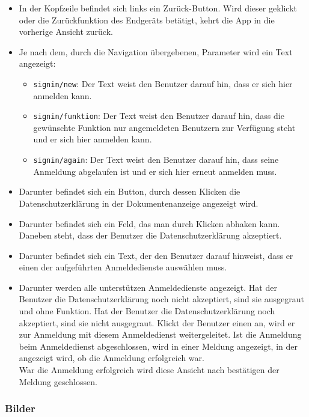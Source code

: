 \begin{itemize}
    \item In der Kopfzeile befindet sich links ein Zurück-Button. Wird dieser geklickt oder die Zurückfunktion 
    des Endgeräts betätigt, kehrt die App in die vorherige Ansicht zurück.
    \item Je nach dem, durch die Navigation übergebenen, Parameter wird ein Text angezeigt:
    \begin{itemize}
        \item \texttt{signin/new}: Der Text weist den Benutzer darauf hin, dass er sich hier anmelden kann.
        \item \texttt{signin/funktion}: Der Text weist den Benutzer darauf hin, dass die gewünschte Funktion nur angemeldeten Benutzern zur Verfügung steht 
        und er sich hier anmelden kann.
        \item \texttt{signin/again}: Der Text weist den Benutzer darauf hin, dass seine Anmeldung abgelaufen ist und er sich hier erneut anmelden muss.
    \end{itemize}
    \item Darunter befindet sich ein Button, durch dessen Klicken die Datenschutzerklärung in der Dokumentenanzeige angezeigt wird.
    \item Darunter befindet sich ein Feld, das man durch Klicken abhaken kann. Daneben steht, dass der Benutzer die Datenschutzerklärung akzeptiert.
    \item Darunter befindet sich ein Text, der den Benutzer darauf hinweist, dass er einen der aufgeführten Anmeldedienste auswählen muss.
    \item Darunter werden alle unterstützen Anmeldedienste angezeigt. Hat der Benutzer die Datenschutzerklärung noch nicht akzeptiert, 
    sind sie ausgegraut und ohne Funktion. Hat der Benutzer die Datenschutzerklärung noch akzeptiert, sind sie nicht ausgegraut. 
    Klickt der Benutzer einen an, wird er zur Anmeldung mit diesem Anmeldedienst weitergeleitet.
    Ist die Anmeldung beim Anmeldedienst abgeschlossen, wird in einer Meldung angezeigt, in der angezeigt wird, ob die Anmeldung erfolgreich war.\\
    War die Anmeldung erfolgreich wird diese Ansicht nach bestätigen der Meldung geschlossen.
\end{itemize}

\subsubsection*{Bilder}\label{App_Signup_Klassen_SignInScreen_Bilder}
\begin{minipage}{\linewidth}
    \centering
    \begin{minipage}{.49\textwidth}
        \captionsetup[figure]{labelformat=empty}
        \captionsetup[figure]{labelformat=default}
    \end{minipage}
\end{minipage}